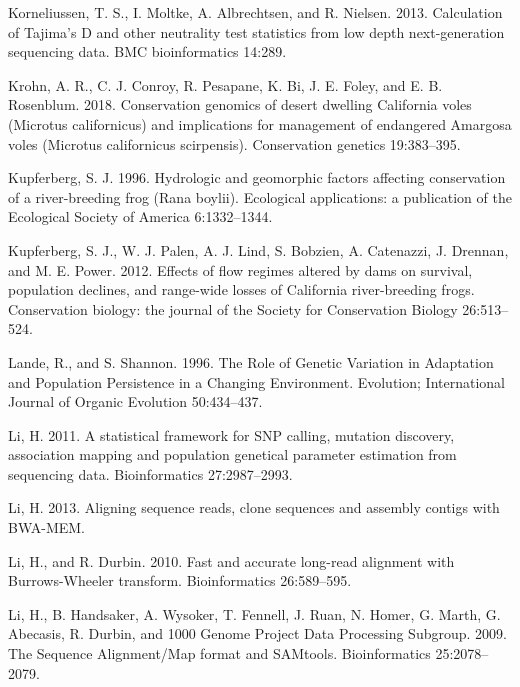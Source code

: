 \documentclass[twoside,12pt,final]{ucthesis-CA2012} %
\begin{document}
\begin{ucmainmatter}
\leavevmode\hypertarget{ref-korneliussen_calculation_2013}{}%
Korneliussen, T. S., I. Moltke, A. Albrechtsen, and R. Nielsen. 2013.
Calculation of Tajima's D and other neutrality test statistics from low
depth next-generation sequencing data. BMC bioinformatics 14:289.

\leavevmode\hypertarget{ref-krohn_conservation_2018}{}%
Krohn, A. R., C. J. Conroy, R. Pesapane, K. Bi, J. E. Foley, and E. B.
Rosenblum. 2018. Conservation genomics of desert dwelling California
voles (Microtus californicus) and implications for management of
endangered Amargosa voles (Microtus californicus scirpensis).
Conservation genetics 19:383--395.

\leavevmode\hypertarget{ref-kupferberg_hydrologic_1996}{}%
Kupferberg, S. J. 1996. Hydrologic and geomorphic factors affecting
conservation of a river-breeding frog (Rana boylii). Ecological
applications: a publication of the Ecological Society of America
6:1332--1344.

\leavevmode\hypertarget{ref-kupferberg_effects_2012}{}%
Kupferberg, S. J., W. J. Palen, A. J. Lind, S. Bobzien, A. Catenazzi, J.
Drennan, and M. E. Power. 2012. Effects of flow regimes altered by dams
on survival, population declines, and range-wide losses of California
river-breeding frogs. Conservation biology: the journal of the Society
for Conservation Biology 26:513--524.

\leavevmode\hypertarget{ref-lande_role_1996}{}%
Lande, R., and S. Shannon. 1996. The Role of Genetic Variation in
Adaptation and Population Persistence in a Changing Environment.
Evolution; International Journal of Organic Evolution 50:434--437.

\leavevmode\hypertarget{ref-li_statistical_2011}{}%
Li, H. 2011. A statistical framework for SNP calling, mutation
discovery, association mapping and population genetical parameter
estimation from sequencing data. Bioinformatics 27:2987--2993.

\leavevmode\hypertarget{ref-li_aligning_2013}{}%
Li, H. 2013. Aligning sequence reads, clone sequences and assembly
contigs with BWA-MEM.

\leavevmode\hypertarget{ref-li_fast_2010}{}%
Li, H., and R. Durbin. 2010. Fast and accurate long-read alignment with
Burrows-Wheeler transform. Bioinformatics 26:589--595.

\leavevmode\hypertarget{ref-li_sequence_2009}{}%
Li, H., B. Handsaker, A. Wysoker, T. Fennell, J. Ruan, N. Homer, G.
Marth, G. Abecasis, R. Durbin, and 1000 Genome Project Data Processing
Subgroup. 2009. The Sequence Alignment/Map format and SAMtools.
Bioinformatics 25:2078--2079.


\end{ucmainmatter}
\end{document}

